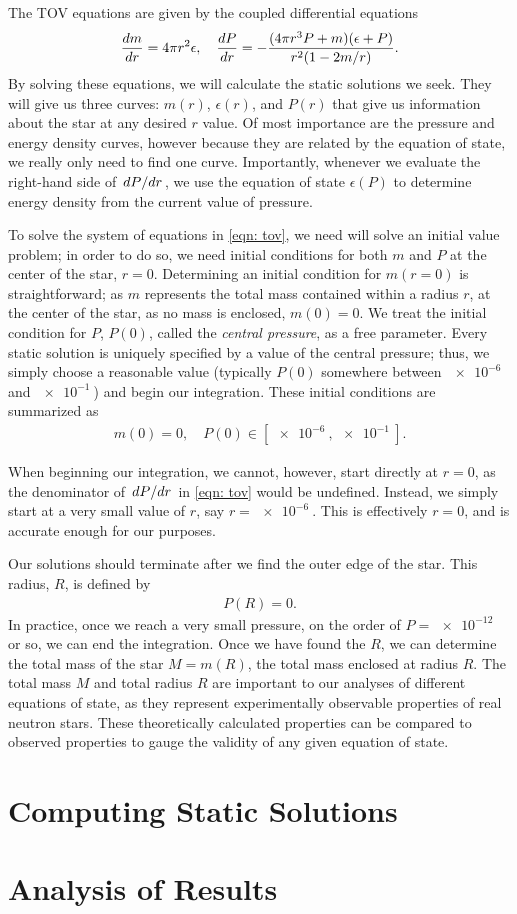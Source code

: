The TOV equations are given by the coupled differential equations
\begin{align}\label{eqn: tov}
    \dv{m}{r} = 4\pi r^2 \epsilon, \quad \dv{P}{r} = -\frac{(4\pi r^3 P + m)(\epsilon + P)}{r^2 (1-2m/r)}.
\end{align}
By solving these equations, we will calculate the static solutions we seek. They will give us three curves: $m(r)$, $\epsilon(r)$, and $P(r)$ that give us information about the star at any desired $r$ value. Of most importance are the pressure and energy density curves, however because they are related by the equation of state, we really only need to find one curve. Importantly, whenever we evaluate the right-hand side of $\dv*{P}{r}$, we use the equation of state $\epsilon(P)$ to determine energy density from the current value of pressure.

To solve the system of equations in \eqref{eqn: tov}, we need will solve an initial value problem; in order to do so, we need initial conditions for both $m$ and $P$ at the center of the star, $r=0$. Determining an initial condition for $m(r=0)$ is straightforward; as $m$ represents the total mass contained within a radius $r$, at the center of the star, as no mass is enclosed, $m(0)=0$. We treat the initial condition for $P$, $P(0)$, called the \textit{central pressure}, as a free parameter. Every static solution is uniquely specified by a value of the central pressure; thus, we simply choose a reasonable value (typically $P(0)$ somewhere between $\SI{e-6}{}$ and $\SI{e-1}{}$) and begin our integration. These initial conditions are summarized as
\begin{align}
    m(0) = 0, \quad P(0) \in [\SI{e-6}{}, \SI{e-1}{}].
\end{align}

When beginning our integration, we cannot, however, start directly at $r=0$, as the denominator of $\dv*{P}{r}$ in \eqref{eqn: tov} would be undefined. Instead, we simply start at a very small value of $r$, say $r=\SI{e-6}{}$. This is effectively $r=0$, and is accurate enough for our purposes.

Our solutions should terminate after we find the outer edge of the star. This radius, $R$, is defined by 
\begin{align}
    P(R) = 0.
\end{align}
In practice, once we reach a very small pressure, on the order of $P = \SI{e-12}{}$ or so, we can end the integration. Once we have found the $R$, we can determine the total mass of the star $M = m(R)$, the total mass enclosed at radius $R$. The total mass $M$ and total radius $R$ are important to our analyses of different equations of state, as they represent experimentally observable properties of real neutron stars. These theoretically calculated properties can be compared to observed properties to gauge the validity of any given equation of state.





\section{Computing Static Solutions}

\section{Analysis of Results}
